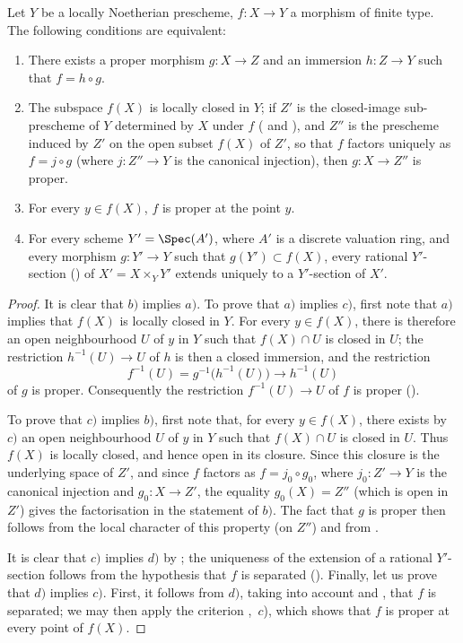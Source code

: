 \begin{corollary}[15.7.6]
\label{IV.15.7.6}
Let $Y$ be a locally Noetherian prescheme, $f:X\to Y$ a morphism of finite type.
The following conditions are equivalent:
\begin{enumerate}[label=\emph{\alph*)}]
  \item There exists a proper morphism $g:X\to Z$ and an immersion $h:Z\to Y$ such that $f=h\circ g$.
  \item The subspace $f(X)$ is locally closed in $Y$; if $Z'$ is the closed-image sub-prescheme of $Y$ determined by $X$ under $f$ ( and ), and $Z''$ is the prescheme induced by $Z'$ on the open subset $f(X)$ of $Z'$, so that $f$ factors uniquely as $f=j\circ g$ (where $j:Z''\to Y$ is the canonical injection), then $g:X\to Z''$ is proper.
  \item For every $y\in f(X)$, $f$ is proper at the point $y$.
  \item For every scheme $Y'=\Spec(A')$, where $A'$ is a discrete valuation ring, and every morphism $g:Y'\to Y$ such that $g(Y')\subset f(X)$, every rational $Y'$-section () of $X'=X\times_Y Y'$ extends uniquely to a $Y'$-section of $X'$.
\end{enumerate}
\end{corollary}

\begin{proof}
It is clear that $b)$ implies $a)$. To prove that $a)$ implies $c)$, first note that $a)$ implies that $f(X)$ is locally closed in $Y$. For every $y\in f(X)$, there is therefore an open neighbourhood $U$ of $y$ in $Y$ such that $f(X)\cap U$ is closed in $U$; the restriction $h^{-1}(U)\to U$ of $h$ is then a closed immersion, and the restriction
\[
  f^{-1}(U)=g^{-1}\bigl(h^{-1}(U)\bigr)\longrightarrow h^{-1}(U)
\]
of $g$ is proper. Consequently the restriction $f^{-1}(U)\to U$ of $f$ is proper ().

To prove that $c)$ implies $b)$, first note that, for every $y\in f(X)$, there exists by $c)$ an open neighbourhood $U$ of $y$ in $Y$ such that $f(X)\cap U$ is closed in $U$. Thus $f(X)$ is locally closed, and hence open in its closure. Since this closure is the underlying space of $Z'$, and since $f$ factors as $f=j_0\circ g_0$, where $j_0:Z'\to Y$ is the canonical injection and $g_0:X\to Z'$, the equality $g_0(X)=Z''$ (which is open in $Z'$) gives the factorisation in the statement of $b)$. The fact that $g$ is proper then follows from the local character of this property (on $Z''$) and from .

It is clear that $c)$ implies $d)$ by ; the uniqueness of the extension of a rational $Y'$-section follows from the hypothesis that $f$ is separated ().
Finally, let us prove that $d)$ implies $c)$. First, it follows from $d)$, taking into account  and , that $f$ is separated; we may then apply the criterion ,~$c$), which shows that $f$ is proper at every point of $f(X)$.
\end{proof}

